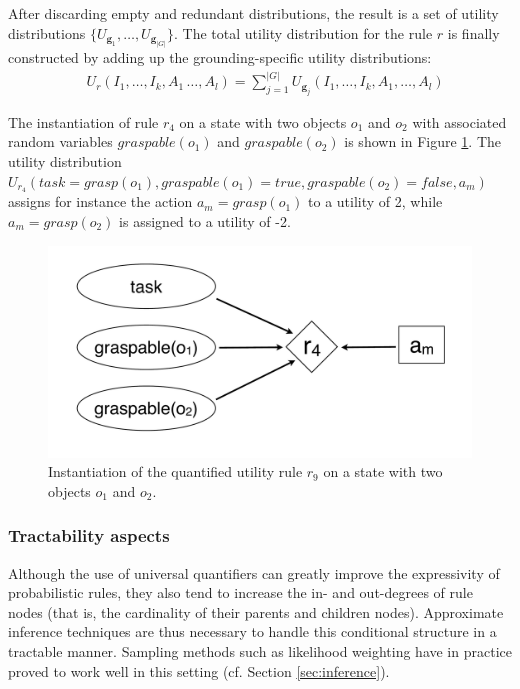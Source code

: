 After discarding empty and redundant distributions, the result is a set of utility distributions $ \{ U_{\mathbf{g}_1}, \dots, U_{\mathbf{g}_{|G|}} \}$. The total utility distribution for the rule $r$ is finally constructed by adding up the grounding-specific utility distributions:   
\begin{align}
& U_{r}(I_1, \dots, I_k, A_1\, \dots, A_l) = \sum_{j=1}^{|G|} U_{\mathbf{g}_j}(I_1, \dots, I_k, A_1, \dots, A_l) \label{eq:quantifuruledistrib}
\end{align}


The instantiation of rule $r_4$ on a state with two objects $o_1$ and $o_2$ with associated random variables $\mathit{graspable}(o_1)$ and $\mathit{graspable}(o_2)$ is shown in Figure  \ref{fig:quantinstantitionutil}.  The utility distribution $U_{r_4}(\mathit{task}\!=\!\mathit{grasp}(o_1), \mathit{graspable}(o_1) \!=\!\mathit{true}, \mathit{graspable}(o_2)\!=\!\mathit{false}, a_m)$ assigns for instance the action $a_m\!=\!\mathit{grasp}(o_1)$ to a utility of 2, while $a_m\!=\!\mathit{grasp(o_2)}$ is assigned to a utility of -2. 


\begin{figure}[h]
\centering
\includegraphics[scale=0.25]{imgs/quantutilruleinstantiation.pdf}
\caption{Instantiation of the quantified utility rule $r_9$ on a state with two objects $o_1$ and $o_2$.}
\label{fig:quantinstantitionutil}
\end{figure}

\subsubsection*{Tractability aspects}

Although the use of universal quantifiers can greatly improve the expressivity of probabilistic rules, they also tend to increase the in- and out-degrees of rule nodes (that is, the cardinality of their parents and children nodes). Approximate inference techniques are thus necessary to handle this conditional structure in a tractable manner. Sampling methods such as likelihood weighting have in practice proved to work well in this setting (cf. Section \ref{sec:inference}).

